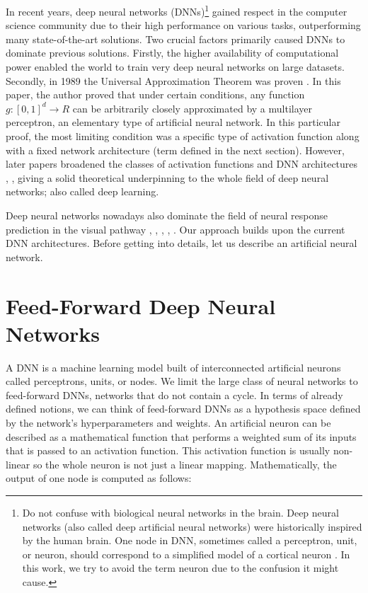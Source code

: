 In recent years, deep neural networks (DNNs)\footnote{Do not confuse with biological neural networks in the brain. Deep neural networks (also called deep artificial neural networks) were historically inspired by the human brain. One node in DNN, sometimes called a perceptron, unit, or neuron, should correspond to a simplified model of a cortical neuron \citep{rosenblatt1958perceptron}. In this work, we try to avoid the term neuron due to the confusion it might cause.} gained respect in the computer science community due to their high performance on various tasks, outperforming many state-of-the-art solutions. Two crucial factors primarily caused DNNs to dominate previous solutions. Firstly, the higher availability of computational power enabled the world to train very deep neural networks on large datasets. Secondly, in 1989 the Universal Approximation Theorem was proven \citep{cybenko1989approximation}. In this paper, the author proved that under certain conditions, any function $g: [0, 1]^d \to R$ can be arbitrarily closely approximated by a multilayer perceptron, an elementary type of artificial neural network. In this particular proof, the most limiting condition was a specific type of activation function along with a fixed network architecture (term defined in the next section). However, later papers broadened the classes of activation functions and DNN architectures \citep{leshno1993multilayer}, \citep{heinecke2020refinement} \citep{zhou2020universality}, giving a solid theoretical underpinning to the whole field of deep neural networks; also called deep learning.

Deep neural networks nowadays also dominate the field of neural response prediction in the visual pathway \citep{klindt2017neural}, \citep{lurz2021generalization}, \citep{ecker2018rotation}, \citep{butts2019data}, \citep{sinz2018stimulus}. Our approach builds upon the current DNN architectures. Before getting into details, let us describe an artificial neural network.

\section{Feed-Forward Deep Neural Networks}

A DNN is a machine learning model built of interconnected artificial neurons called perceptrons, units, or nodes. We limit the large class of neural networks to feed-forward DNNs, networks that do not contain a cycle. In terms of already defined notions, we can think of feed-forward DNNs as a hypothesis space defined by the network’s hyperparameters and weights. An artificial neuron can be described as a mathematical function that performs a weighted sum of its inputs that is passed to an activation function. This activation function is usually non-linear so the whole neuron is not just a linear mapping. Mathematically, the output of one node is computed as follows: 

